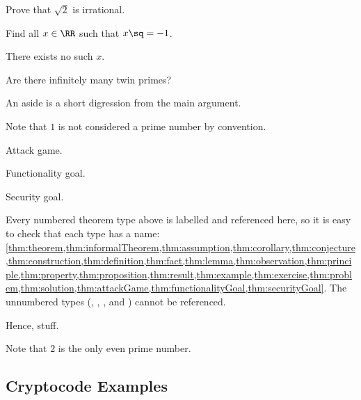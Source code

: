 \begin{exercise}\label{thm:exercise}
  Prove that $\sqrt{2}$ is irrational.
\end{exercise}
\begin{problem}\label{thm:problem}
  Find all $x \in \RR$ such that $x\sq = -1$.
\end{problem}
\begin{solution}\label{thm:solution}
  There exists no such $x$.
\end{solution}
\begin{question}
  Are there infinitely many twin primes?
\end{question}
\begin{aside}
  An aside is a short digression from the main argument.
\end{aside}
\begin{remark}
  Note that $1$ is not considered a prime number by convention.
\end{remark}
\begin{attackgame}\label{thm:attackGame}
  Attack game.
\end{attackgame}
\begin{functionalitygoal}\label{thm:functionalityGoal}
  Functionality goal.
\end{functionalitygoal}
\begin{securitygoal}\label{thm:securityGoal}
  Security goal.
\end{securitygoal}

Every numbered theorem type above is labelled and referenced here, so it is easy to check that each type has a name: \cref{thm:theorem,thm:informalTheorem,thm:assumption,thm:corollary,thm:conjecture,thm:construction,thm:definition,thm:fact,thm:lemma,thm:observation,thm:principle,thm:property,thm:proposition,thm:result,thm:example,thm:exercise,thm:problem,thm:solution,thm:attackGame,thm:functionalityGoal,thm:securityGoal}. The unnumbered types (, , , and ) cannot be referenced.

\begin{resultbox}
  Hence, stuff.
\end{resultbox}
\begin{remarkbox}
  Note that $2$ is the only even prime number.
\end{remarkbox}

\subsection{Cryptocode Examples}

